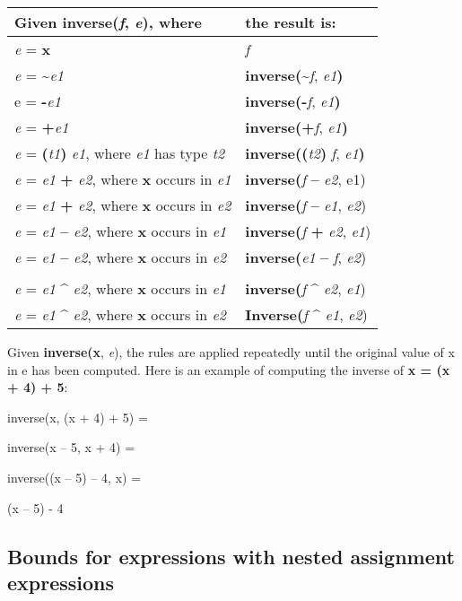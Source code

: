 \documentclass[]{article}
\begin{document}
\begin{longtable}[c]{@{}ll@{}}
\toprule
\textbf{Given inverse(}\emph{f}\textbf{,} \emph{e}\textbf{), where} &
\textbf{the result is:}\tabularnewline
\midrule
\endhead
\emph{e} = \textbf{x} & \emph{f}\tabularnewline
\emph{e} = \textbf{\textasciitilde{}}\emph{e1} &
\textbf{inverse(\textasciitilde{}}\emph{f},
\emph{e1}\textbf{)}\tabularnewline
e = \textbf{-}\emph{e1} & \textbf{inverse(-}\emph{f},
\emph{e1}\textbf{)}\tabularnewline
\emph{e} = \textbf{+}\emph{e1} & \textbf{inverse(+}\emph{f},
\emph{e1}\textbf{)}\tabularnewline
\emph{e} = \textbf{(}\emph{t1}\textbf{)} \emph{e1}, where \emph{e1} has
type \emph{t2} & \textbf{inverse((}\emph{t2}\textbf{)} \emph{f},
\emph{e1}\textbf{)}\tabularnewline
\emph{e} = \emph{e1} \textbf{+} \emph{e2}, where \textbf{x} occurs in
\emph{e1} & \textbf{inverse(}\emph{f} \textbf{--} \emph{e2},
e1)\tabularnewline
\emph{e} = \emph{e1} \textbf{+} \emph{e2}, where \textbf{x} occurs in
\emph{e2} & \textbf{inverse(}\emph{f} \textbf{--} \emph{e1},
\emph{e2})\tabularnewline
\emph{e} = \emph{e1} \textbf{--} \emph{e2}, where \textbf{x} occurs in
\emph{e1} & \textbf{inverse(}\emph{f} \textbf{+} \emph{e2},
\emph{e1})\tabularnewline
\emph{e} = \emph{e1} \textbf{--} \emph{e2}, where \textbf{x} occurs in
\emph{e2} & \textbf{inverse(}\emph{e1} \textbf{--} \emph{f},
\emph{e2})\tabularnewline
&\tabularnewline
\emph{e} = \emph{e1} \textbf{\^{}} \emph{e2}, where \textbf{x} occurs in
\emph{e1} & \textbf{inverse(}\emph{f} \textbf{\^{}} \emph{e2},
\emph{e1})\tabularnewline
\emph{e} = \emph{e1} \textbf{\^{}} \emph{e2}, where \textbf{x} occurs in
\emph{e2} & \textbf{Inverse(}\emph{f} \textbf{\^{}} \emph{e1},
\emph{e2})\tabularnewline
\bottomrule
\end{longtable}

Given \textbf{inverse(x}, \emph{e}), the rules are applied repeatedly
until the original value of x in e has been computed. Here is an example
of computing the inverse of \textbf{x = (x + 4) + 5}:

inverse(x, (x + 4) + 5) =

inverse(x -- 5, x + 4) =

inverse((x -- 5) -- 4, x) =

(x -- 5) - 4

\subsection{\texorpdfstring{\protect\hypertarget{ux5fRef425340957}{}{\protect\hypertarget{ux5fRef425341005}{}{\protect\hypertarget{ux5fToc426641084}{}{\protect\hypertarget{ux5fToc435434959}{}{\protect\hypertarget{ux5fToc437460786}{}{\protect\hypertarget{ux5fToc440445465}{}{\protect\hypertarget{ux5fToc440449247}{}{\protect\hypertarget{ux5fToc440551897}{}{\protect\hypertarget{ux5fToc424307701}{}{\protect\hypertarget{ux5fToc420589196}{}{\protect\hypertarget{ux5fToc422906987}{}{\protect\hypertarget{ux5fRef423103047}{}{}}}}}}}}}}}}Bounds
for expressions with nested assignment
expressions}{Bounds for expressions with nested assignment expressions}}\label{bounds-for-expressions-with-nested-assignment-expressions}
\end{document}
